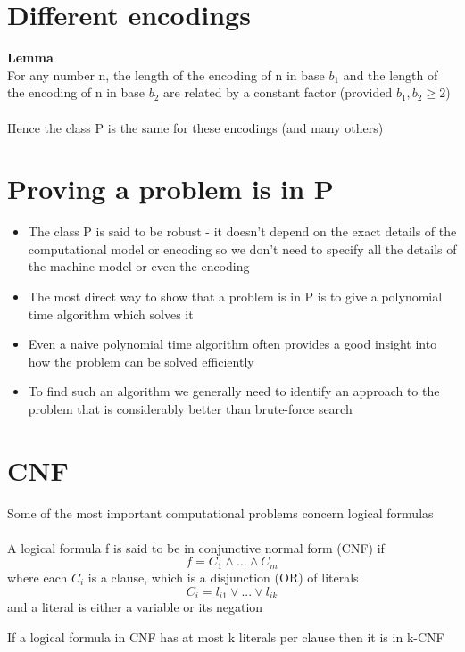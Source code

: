 \documentclass{article}[18pt]
\begin{document}
\section{Different encodings}
\textbf{Lemma}\\
For any number n, the length of the encoding of n in base $b_1$ and the length of the encoding of n in base $b_2$ are related by a constant factor (provided $b_1,b_2\geqslant 2$)\\
\\
Hence the class P is the same for these encodings (and many others)
\section{Proving a problem is in P}
\begin{itemize}
	\item The class P is said to be robust - it doesn't depend on the exact details of the computational model or encoding so we don't need to specify all the details of the machine model or even the encoding
	\item The most direct way to show that a problem is in P is to give a polynomial time algorithm which solves it 
	\item Even a naive polynomial time algorithm often provides a good insight into how the problem can be solved efficiently
	\item To find such an algorithm we generally need to identify an approach to the problem that is considerably better than brute-force search
\end{itemize}
\section{CNF}
Some of the most important computational problems concern logical formulas\\
\\
A logical formula f is said to be in conjunctive normal form (CNF) if
$$f=C_1\land ... \land C_m$$
where each $C_i$ is a clause, which is a disjunction (OR) of literals
$$C_i=l_{i1}\lor ... \lor l_{ik}$$
and a literal is either a variable or its negation
\begin{definition}[k-CNF]
If a logical formula in CNF has at most k literals per clause then it is in k-CNF
\end{definition}
\end{document}
